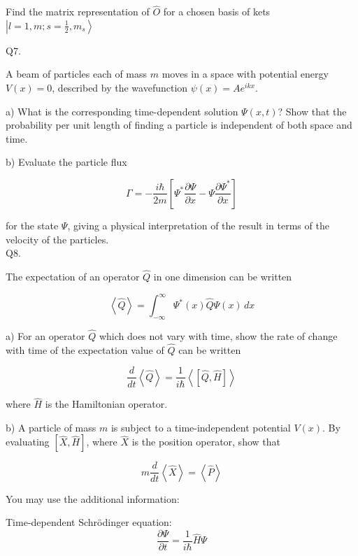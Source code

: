 \documentclass[a4paper,11pt]{article}
\begin{document}
\smallskip

Find the matrix representation of \( \hat{O} \) for a chosen basis of kets \( \left|l=1, m; s=\frac{1}{2}, m_{s} \right> \)

\bigskip

Q7.

A beam of particles each of mass \( m \) moves in a space with potential energy \( V(x) = 0 \), described by the wavefunction \( \psi(x) = Ae^{ikx} \).

\medskip

a) What is the corresponding time-dependent solution \( \Psi(x,t) \)? Show that the probability per unit length of finding a particle is independent of both space and time.

\medskip

b) Evaluate the particle flux 

\[ \Gamma = -\frac{i\hbar}{2m}\left[ \Psi^{*}\frac{\partial\Psi}{\partial x} - \Psi\frac{\partial\Psi^{*}}{\partial x} \right] \]

for the state \( \Psi \), giving a physical interpretation of the result in terms of the velocity of the particles. \\

Q8.


The expectation of an operator \( \hat{Q} \) in one dimension can be written 

\[ \left< \hat{Q} \right> = \int_{-\infty}^{\infty} \Psi^{*}(x) \hat{Q} \Psi(x) \, dx \]

\medskip

a) For an operator \( \hat{Q} \) which does not vary with time, show the rate of change with time of the expectation value of \( \hat{Q} \) can be written

\[ \frac{d}{dt}\left<\hat{Q}\right> = \frac{1}{i\hbar}\left< \left[ \hat{Q}, \hat{H} \right] \right> \]

where \( \hat{H} \) is the Hamiltonian operator.  

\medskip

b) A particle of mass \( m \) is subject to a time-independent potential \( V(x) \). By evaluating \( \left[ \hat{X}, \hat{H}\right] \), where \( \hat{X} \) is the position operator, show that 

\[ m\frac{d}{dt}\left<\hat{X}\right> = \left<\hat{P}\right> \]

You may use the additional information: 

Time-dependent Schrödinger equation:
\[ \frac{\partial\Psi}{\partial t} = \frac{1}{i\hbar}\hat{H}\Psi \] \\
\end{document}
